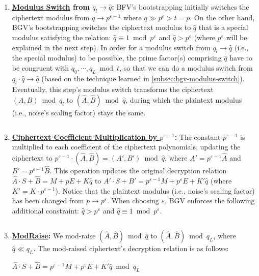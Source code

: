\begin{enumerate}

\item \textbf{\underline{Modulus Switch} from \boldmath$q_l \rightarrow \hat{q}$:} BFV's bootstrapping initially switches the ciphertext modulus from $q \rightarrow p^{\varepsilon-1}$ where $q \gg p^\varepsilon > t = p$. On the other hand, BGV's bootstrapping switches the ciphertext modulus to $\hat{q}$ that is a special modulus satisfying the relation: $\hat{q} \equiv 1 \bmod p^\varepsilon$ and $\hat{q} > p^\varepsilon$ (where $p^\varepsilon$ will be explained in the next step). In order for a modulus switch from $q_l \rightarrow \hat{q}$ (i.e., the special modulus) to be possible, the prime factor(s) comprising $\hat{q}$ have to be congruent with $q_{0}, \cdots, q_L \bmod t$, so that we can do a modulus switch from $q_l\cdot \hat{q} \rightarrow \hat{q}$ (based on the technique learned in \autoref{subsec:bgv-modulus-switch}). Eventually, this step's modulus switch transforms the ciphertext $(A, B) \bmod q_l$ to $(\hat{A}, \hat{B}) \bmod \hat{q}$, during which the plaintext modulus (i.e., noise's scaling factor) stays the same. 

$ $

\item \textbf{\underline{Ciphertext Coefficient Multiplication by \boldmath$p^{\varepsilon-1}$}:} 
The constant $p^{\varepsilon-1}$ is multiplied to each coefficient of the ciphertext polynomials, updating the ciphertext to $p^{\varepsilon-1} \cdot (\hat{A}, \hat{B}) = (A', B') \bmod \hat{q}$, where $A' = p^{\varepsilon-1}\hat{A}$ and $B' = p^{\varepsilon-1}\hat{B}$. This operation updates the original decryption relation $\hat{A}\cdot S + \hat{B} = M + p E + K\hat{q}$ to $A'\cdot S + B' = p^{\varepsilon-1} M + p^\varepsilon E + K'\hat{q}$ (where $K' = K \cdot p^{\varepsilon - 1}$). Notice that the plaintext modulus (i.e., noise's scaling factor) has been changed from $p \rightarrow p^\varepsilon$. When choosing $\varepsilon$, BGV enforces the following additional constraint: $\hat{q} > p^\varepsilon$ and $\hat{q}  \equiv 1 \bmod p^\varepsilon$.

$ $

\item \textbf{\underline{\textsf{ModRaise}}:} We mod-raise $(\hat{A}, \hat{B}) \bmod \hat{q}$ to $(\hat{A}, \hat{B}) \bmod q_L$, where $\hat{q} \ll q_L$. The mod-raised ciphertext's decryption relation is as follows:

$\hat{A}\cdot S + \hat{B} = p^{\varepsilon-1}M + p^\varepsilon E + K'\hat{q} \bmod q_L$


\end{enumerate}

